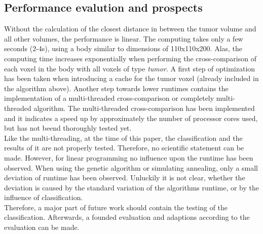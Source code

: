 \subsection{Performance evalution and prospects}
Without the calculation of the closest distance in between the tumor volume and all other volumes, the performance is linear. The computing takes only a few seconds (2-4s), using a body similar to dimensions of 110x110x200. Alas, the computing time increases exponentially when performing the cross-comparison of each voxel in the body with all voxels of type \textit{tumor}. A first step of optimization has been taken when introducing a cache for the tumor voxel (already included in the algorithm above). Another step towards lower runtimes contains the implementation of a multi-threaded cross-comparison or completely multi-threaded algorithm. The multi-threaded cross-comparison has been implemented and it indicates a speed up by approximately the number of processor cores used, but has not beend thoroughly tested yet. \\
Like the multi-threading, at the time of this paper, the classification and the results of it are not properly tested. Therefore, no scientific statement can be made. However, for linear programming no influence upon the runtime has been observed. When using the genetic algorithm or simulating annealing, only a small deviation of runtime has been observed. Unluckily it is not clear, whether the deviation is caused by the standard variation of the algorithms runtime, or by the influence of classification.\\
Therefore, a major part of future work should contain the testing of the classification. Afterwards, a founded evaluation and adaptions according to the evaluation can be made.

